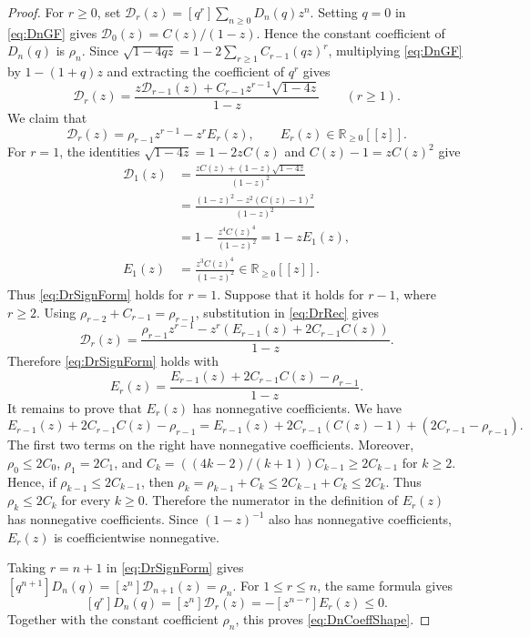 \documentclass[11pt]{article}
\theoremstyle{plain}
\theoremstyle{remark}
\begin{document}
\begin{proof}
For $r\ge0$, set
$\mathcal D_r(z)=[q^r]\sum_{n\ge0}D_n(q)z^n$.  Setting $q=0$ in
\eqref{eq:DnGF} gives
$\mathcal D_0(z)=C(z)/(1-z)$.  Hence the constant coefficient of
$D_n(q)$ is $\rho_n$.  Since
$\sqrt{1-4qz}=1-2\sum_{r\ge1}C_{r-1}(qz)^r$, multiplying
\eqref{eq:DnGF} by $1-(1+q)z$ and extracting the coefficient of
$q^r$ gives
\begin{equation}\label{eq:DrRec}
\mathcal D_r(z)=\frac{z\mathcal D_{r-1}(z)+C_{r-1}z^{r-1}\sqrt{1-4z}}{1-z}
\qquad (r\ge1).
\end{equation}
We claim that
\begin{equation}\label{eq:DrSignForm}
\mathcal D_r(z)=\rho_{r-1}z^{r-1}-z^rE_r(z),
\qquad E_r(z)\in\mathbb R_{\ge0}[[z]].
\end{equation}
For $r=1$, the identities
$\sqrt{1-4z}=1-2zC(z)$ and $C(z)-1=zC(z)^2$ give
\[
\begin{aligned}
\mathcal D_1(z)
&=\frac{zC(z)+(1-z)\sqrt{1-4z}}{(1-z)^2}\\
&=\frac{(1-z)^2-z^2(C(z)-1)^2}{(1-z)^2}\\
&=1-\frac{z^4C(z)^4}{(1-z)^2}
 =1-zE_1(z),\\
E_1(z)
&=\frac{z^3C(z)^4}{(1-z)^2}
 \in\mathbb R_{\ge0}[[z]].
\end{aligned}
\]
Thus \eqref{eq:DrSignForm} holds for $r=1$.  Suppose that it holds for
$r-1$, where $r\ge2$.  Using
$\rho_{r-2}+C_{r-1}=\rho_{r-1}$, substitution in
\eqref{eq:DrRec} gives
\[
\mathcal D_r(z)=\frac{\rho_{r-1}z^{r-1}
-z^r(E_{r-1}(z)+2C_{r-1}C(z))}{1-z}.
\]
Therefore \eqref{eq:DrSignForm} holds with
\[
E_r(z)=\frac{E_{r-1}(z)+2C_{r-1}C(z)-\rho_{r-1}}{1-z}.
\]
It remains to prove that $E_r(z)$ has nonnegative coefficients.  We have
\[
E_{r-1}(z)+2C_{r-1}C(z)-\rho_{r-1}
=E_{r-1}(z)+2C_{r-1}(C(z)-1)
 +(2C_{r-1}-\rho_{r-1}).
\]
The first two terms on the right have nonnegative coefficients.
Moreover,
$\rho_0\le2C_0$, $\rho_1=2C_1$, and
$C_k=((4k-2)/(k+1))C_{k-1}\ge2C_{k-1}$ for $k\ge2$.  Hence, if
$\rho_{k-1}\le2C_{k-1}$, then
$\rho_k=\rho_{k-1}+C_k\le2C_{k-1}+C_k\le2C_k$.  Thus
$\rho_k\le2C_k$ for every $k\ge0$.  Therefore the numerator in the
definition of $E_r(z)$ has nonnegative
coefficients.  Since $(1-z)^{-1}$ also has nonnegative coefficients,
$E_r(z)$ is coefficientwise nonnegative.

Taking $r=n+1$ in \eqref{eq:DrSignForm} gives
$[q^{n+1}]D_n(q)=[z^n]\mathcal D_{n+1}(z)=\rho_n$.  For
$1\le r\le n$, the same formula gives
\[
[q^r]D_n(q)=[z^n]\mathcal D_r(z)
=-[z^{n-r}]E_r(z)\le0.
\]
Together with the constant coefficient $\rho_n$, this proves
\eqref{eq:DnCoeffShape}.
\end{proof}
\end{document}
